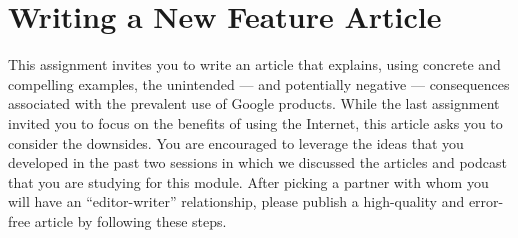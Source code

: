 \section*{Writing a New Feature Article}

This assignment invites you to write an article that explains, using concrete and compelling examples, the unintended
--- and potentially negative --- consequences associated with the prevalent use of Google products. While the last
assignment invited you to focus on the benefits of using the Internet, this article asks you to consider the downsides.
You are encouraged to leverage the ideas that you developed in the past two sessions in which we discussed the articles
and podcast that you are studying for this module. After picking a partner with whom you will have an ``editor-writer''
relationship, please publish a high-quality and error-free article by following these steps.

\vspace*{-.1in}

